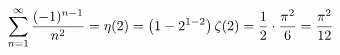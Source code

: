 \documentclass[preview]{standalone}
\begin{document}
\begin{align*}
\special{dvisvgm:raw <g id='unique000'>}\displaystyle\sum_{n=1}^{\infty}\dfrac{(-1)^{n-1}}{n^2}=\eta(2)=\left(1-2^{1-2}\right)\zeta(2)=\dfrac{1}{2}\cdot\dfrac{\pi^2}{6}=\dfrac{\pi^2}{12}\special{dvisvgm:raw </g>}
\end{align*}
\end{document}
